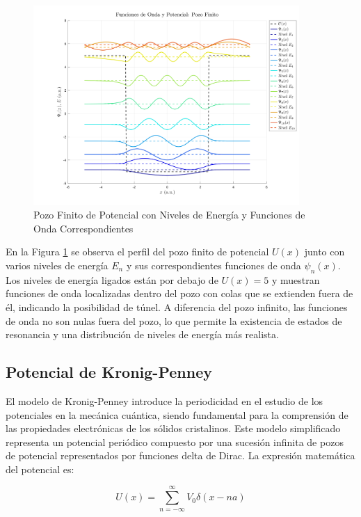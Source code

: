 \documentclass[a4paper,12pt]{article}
\begin{document}
\begin{figure}[H]
    \centering
    \includegraphics[width=0.9\textwidth]{img/Pozo_Finito.png}
    \caption{Pozo Finito de Potencial con Niveles de Energía y Funciones de Onda Correspondientes}
    \label{fig:pozo_finito}
\end{figure}

\noindent
En la Figura \ref{fig:pozo_finito} se observa el perfil del pozo finito de potencial \( U(x) \) junto con varios niveles de energía \( E_n \) y sus correspondientes funciones de onda \( \psi_n(x) \). Los niveles de energía ligados están por debajo de \( U(x) = 5 \) y muestran funciones de onda localizadas dentro del pozo con colas que se extienden fuera de él, indicando la posibilidad de túnel. A diferencia del pozo infinito, las funciones de onda no son nulas fuera del pozo, lo que permite la existencia de estados de resonancia y una distribución de niveles de energía más realista.

\subsection{Potencial de Kronig-Penney}

El modelo de Kronig-Penney introduce la periodicidad en el estudio de los potenciales en la mecánica cuántica, siendo fundamental para la comprensión de las propiedades electrónicas de los sólidos cristalinos. Este modelo simplificado representa un potencial periódico compuesto por una sucesión infinita de pozos de potencial representados por funciones delta de Dirac. La expresión matemática del potencial es:

\begin{equation}
    U(x) = \sum_{n=-\infty}^{\infty} V_0 \delta(x - na)
\end{equation}
\end{document}
